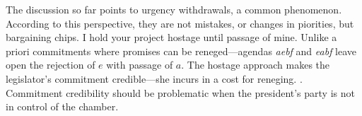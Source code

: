 \documentclass[letter,12pt]{article}
\newcommand{\mc}{\multicolumn}
\begin{document}
The discussion so far points to urgency withdrawals, a common phenomenon. According to this perspective, they are not mistakes, or changes in piorities, but bargaining chips. I hold your project hostage until passage of mine. Unlike a priori commitments where promises can be reneged---agendas \emph{aebf} and \emph{eabf} leave open the rejection of $e$ with passage of $a$. The hostage approach makes the legislator's commitment credible---she incurs in a cost for reneging. \citep[Although it is the president's word that is now questionable, she could call $f$ urgent after passage of $e$ to keep $a_0$ in place, cf.][]{weingast.1992}. Commitment credibility should be problematic when the president's party is not in control of the chamber. 

\end{document}
